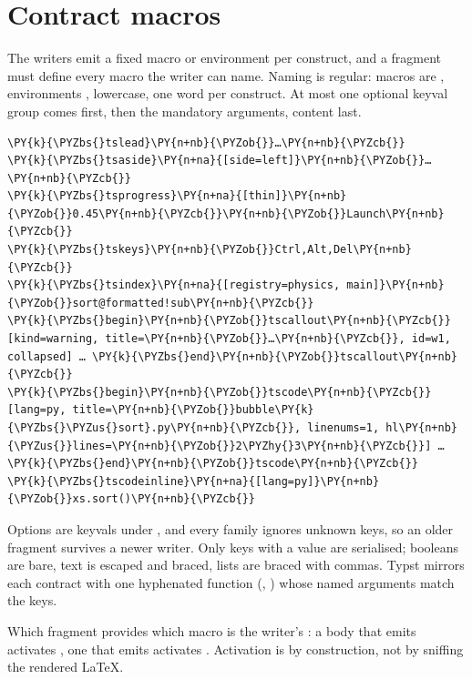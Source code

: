 \documentclass[a4paper,twoside]{article}
\begin{document}
\section{Contract macros}
The writers emit a fixed macro or environment per construct, and a fragment must
define every macro the writer can name. Naming is regular: macros are
, environments , lowercase, one word per construct. At most
one optional keyval group comes first, then the mandatory arguments, content
last.
\begin{tscode}[lang=latex, engine=pygments]
\begin{Verbatim}[commandchars=\\\{\},breaklines, breakanywhere, commandchars=\\\{\}]
\PY{k}{\PYZbs{}tslead}\PY{n+nb}{\PYZob{}}…\PY{n+nb}{\PYZcb{}}
\PY{k}{\PYZbs{}tsaside}\PY{n+na}{[side=left]}\PY{n+nb}{\PYZob{}}…\PY{n+nb}{\PYZcb{}}
\PY{k}{\PYZbs{}tsprogress}\PY{n+na}{[thin]}\PY{n+nb}{\PYZob{}}0.45\PY{n+nb}{\PYZcb{}}\PY{n+nb}{\PYZob{}}Launch\PY{n+nb}{\PYZcb{}}
\PY{k}{\PYZbs{}tskeys}\PY{n+nb}{\PYZob{}}Ctrl,Alt,Del\PY{n+nb}{\PYZcb{}}
\PY{k}{\PYZbs{}tsindex}\PY{n+na}{[registry=physics, main]}\PY{n+nb}{\PYZob{}}sort@formatted!sub\PY{n+nb}{\PYZcb{}}
\PY{k}{\PYZbs{}begin}\PY{n+nb}{\PYZob{}}tscallout\PY{n+nb}{\PYZcb{}}[kind=warning, title=\PY{n+nb}{\PYZob{}}…\PY{n+nb}{\PYZcb{}}, id=w1, collapsed] … \PY{k}{\PYZbs{}end}\PY{n+nb}{\PYZob{}}tscallout\PY{n+nb}{\PYZcb{}}
\PY{k}{\PYZbs{}begin}\PY{n+nb}{\PYZob{}}tscode\PY{n+nb}{\PYZcb{}}[lang=py, title=\PY{n+nb}{\PYZob{}}bubble\PY{k}{\PYZbs{}\PYZus{}sort}.py\PY{n+nb}{\PYZcb{}}, linenums=1, hl\PY{n+nb}{\PYZus{}}lines=\PY{n+nb}{\PYZob{}}2\PYZhy{}3\PY{n+nb}{\PYZcb{}}] … \PY{k}{\PYZbs{}end}\PY{n+nb}{\PYZob{}}tscode\PY{n+nb}{\PYZcb{}}
\PY{k}{\PYZbs{}tscodeinline}\PY{n+na}{[lang=py]}\PY{n+nb}{\PYZob{}}xs.sort()\PY{n+nb}{\PYZcb{}}
\end{Verbatim}
\end{tscode}
Options are  keyvals under , and every family ignores
unknown keys, so an older fragment survives a newer writer. Only keys with a
value are serialised; booleans are bare, text is escaped and braced, lists are
braced with commas. Typst mirrors each contract with one hyphenated function
(, ) whose named arguments match the keys.

Which fragment provides which macro is the writer's : a body
that emits  activates , one that emits 
activates . Activation is by construction, not by sniffing the
rendered \LaTeX{}.
\end{document}
